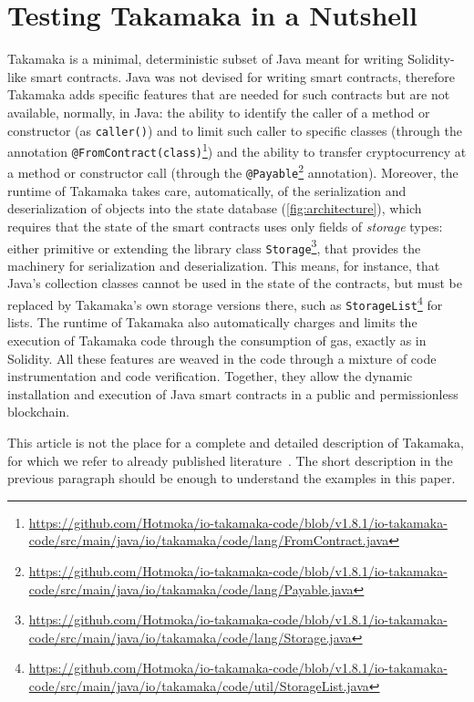 \section{Testing Takamaka in a Nutshell}\label{sec:takamaka}

Takamaka is a minimal, deterministic subset of Java meant for writing Solidity-like
smart contracts. Java was not devised for writing smart contracts, therefore
Takamaka adds specific features that are needed for such contracts but are not
available, normally, in Java: the ability to identify the caller of a method
or constructor (as \texttt{caller()}) and to limit such caller to specific classes
(through the annotation \texttt{@FromContract(class)}\footnote{\url{https://github.com/Hotmoka/io-takamaka-code/blob/v1.8.1/io-takamaka-code/src/main/java/io/takamaka/code/lang/FromContract.java}})
and the ability to transfer
cryptocurrency at a method or constructor call (through the \texttt{@Payable}\footnote{\url{https://github.com/Hotmoka/io-takamaka-code/blob/v1.8.1/io-takamaka-code/src/main/java/io/takamaka/code/lang/Payable.java}}
annotation). Moreover, the runtime of Takamaka takes care, automatically, of
the serialization and deserialization of objects into the state database
(\cref{fig:architecture}), which requires that the state of the smart contracts
uses only fields of \emph{storage} types: either primitive or extending
the library class \texttt{Storage}\footnote{\url{https://github.com/Hotmoka/io-takamaka-code/blob/v1.8.1/io-takamaka-code/src/main/java/io/takamaka/code/lang/Storage.java}},
that provides the machinery
for serialization and deserialization. This means, for instance, that Java's collection
classes cannot be used in the state of the contracts, but must be replaced by
Takamaka's own storage versions there, such as \texttt{StorageList}\footnote{\url{https://github.com/Hotmoka/io-takamaka-code/blob/v1.8.1/io-takamaka-code/src/main/java/io/takamaka/code/util/StorageList.java}} for lists.
The runtime of Takamaka also automatically charges and limits the execution
of Takamaka code through the consumption of gas, exactly as in Solidity.
All these features are weaved in the code through a mixture of code instrumentation
and code verification. Together, they allow the dynamic installation and execution of
Java smart contracts in a public and permissionless blockchain.

This article is not the place for a complete and detailed description of Takamaka,
for which we refer to already published literature~\citep{Spoto19,OlivieriST25}.
The short description in the previous paragraph
should be enough to understand the examples in this paper.

